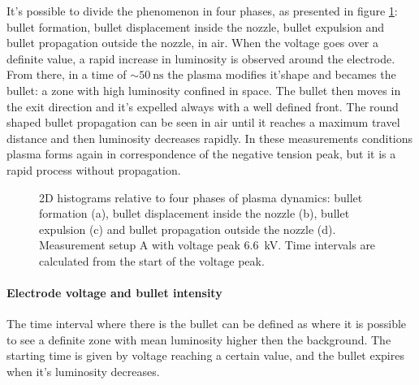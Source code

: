 It's possible to divide the phenomenon in four phases, as presented in figure \ref{fig:bullet_es}: bullet formation, bullet displacement inside the nozzle, bullet expulsion and bullet propagation outside the nozzle, in air. %
When the voltage goes over a definite value, a rapid increase in luminosity is observed around the electrode. From there, in a time of $\sim \SI{50}{\nano\second}$ the plasma modifies it'shape and becames the bullet: a zone with high luminosity confined in space. The bullet then moves in the exit direction and it's expelled always with a well defined front. The round shaped bullet propagation can be seen in air until it reaches a maximum travel distance and then luminosity decreases rapidly. In these measurements conditions plasma forms again in correspondence of the negative tension peak, but it is a rapid process without propagation.
\begin{figure}
 \centering
 \hfill
 
 \hfill
 \caption{2D histograms relative to four phases of plasma dynamics: bullet formation (a), bullet displacement inside the nozzle (b), bullet expulsion (c) and bullet propagation outside the nozzle (d). Measurement setup A with voltage peak \SI{6.6}{\kilo\volt}. Time intervals are calculated from the start of the voltage peak.}
 \label{fig:bullet_es}
\end{figure}


\paragraph{Electrode voltage and bullet intensity}
The time interval where there is the bullet can be defined as where it is possible to see a definite zone with mean luminosity higher then the background. The starting time is given by voltage reaching a certain value, and the bullet expires when it's luminosity decreases.

